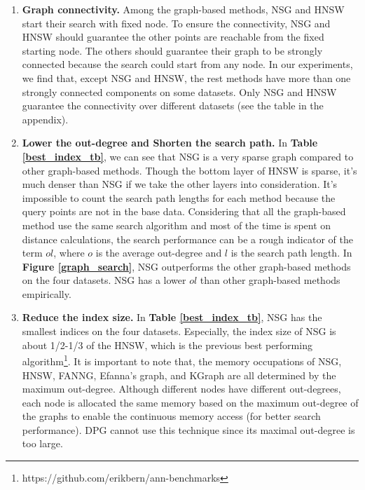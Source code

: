 \documentclass{vldb}
\begin{document}
\begin{figure*}[t]
	\centering
	\vspace*{-4mm}
	\caption{ANNS performance of graph-based algorithms with their optimal indices in high-precision region on the four datasets (top right is better). Some of the non-graph based methods have much worse performance than the graph-based ones. So we break the y-axis of SIFT1M and GIST1M figures, and we break the x-axis of the RAND4M figure (RAND4M$_1$ and RAND4M$_2$) to provide better view of the curves. The x-axis is not applicable for Serial-Scan because the results are accurate. }
	\label{graph_search}
\end{figure*}
\begin{enumerate}
\setlength{\itemsep}{1pt}
\setlength{\parskip}{0pt}
\setlength{\parsep}{0pt}
\item \textbf{Graph connectivity.} Among the graph-based methods, NSG and HNSW start their search with fixed node. To ensure the connectivity, NSG and HNSW should guarantee the other points are reachable from the fixed starting node. The others should guarantee their graph to be strongly connected because the search could start from any node. In our experiments, we find that, except NSG and HNSW, the rest methods have more than one strongly connected components on some datasets. Only NSG and HNSW guarantee the connectivity over different datasets (see the table in the appendix).

\item \textbf{Lower the out-degree and Shorten the search path.} In \textbf{Table \ref{best_index_tb}}, we can see that NSG is a very sparse graph compared to other graph-based methods. Though the bottom layer of HNSW is sparse, it's much denser than NSG if we take the other layers into consideration. It's impossible to count the search path lengths for each method because the query points are not in the base data. Considering that all the graph-based method use the same search algorithm and most of the time is spent on distance calculations, the search performance can be a rough indicator of the term $ol$, where $o$ is the average out-degree and $l$ is the search path length. In \textbf{Figure \ref{graph_search}}, NSG outperforms the other graph-based methods on the four datasets. NSG has a lower $ol$ than other graph-based methods empirically. 

\item \textbf{Reduce the index size.} In \textbf{Table \ref{best_index_tb}}, NSG has the smallest indices on the four datasets. Especially, the index size of NSG is about 1/2-1/3 of the HNSW, which is the previous best performing algorithm\footnote{https://github.com/erikbern/ann-benchmarks}. It is important to note that, the memory occupations of NSG, HNSW, FANNG, Efanna's graph, and KGraph are all determined by the maximum out-degree. Although different nodes have different out-degrees, each node is allocated the same memory based on the maximum out-degree of the graphs to enable the continuous memory access (for better search performance). DPG cannot use this technique since its maximal out-degree is too large.


\end{enumerate}
\end{document}
